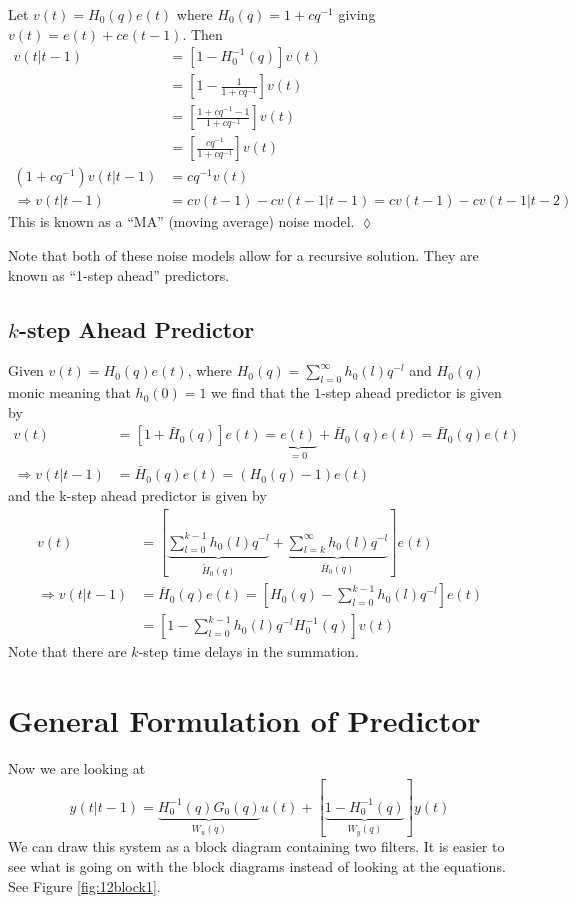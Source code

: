 \begin{example}
Let $v(t)=H_0(q)e(t)$ where $H_0(q)=1+cq^{-1}$ giving $v(t)=e(t)+ce(t-1)$. Then
\begin{align*}
v(t|t-1) &= [1-H_0^{-1}(q)]v(t) \\
&= \left[1-\frac{1}{1+cq^{-1}}\right]v(t) \\
&= \left[\frac{1+cq^{-1}-1}{1+cq^{-1}}\right]v(t) \\
&= \left[\frac{cq^{-1}}{1+cq^{-1}}\right]v(t) \\
(1+cq^{-1})v(t|t-1) &= cq^{-1}v(t) \\
\Rightarrow v(t|t-1) &= cv(t-1)-cv(t-1|t-1) = cv(t-1)-cv(t-1|t-2)
\end{align*}
This is known as a ``MA'' (moving average) noise model.
$\lozenge$
\end{example}

Note that both of these noise models allow for a recursive solution. They are known as ``1-step ahead'' predictors.

\subsection{$k$-step Ahead Predictor}
Given $v(t)=H_0(q)e(t)$, where $H_0(q)=\sum_{l=0}^\infty h_0(l)q^{-l}$ and $H_0(q)$ monic meaning that $h_0(0)=1$ we find that the $1$-step ahead predictor is given by
\begin{align*}
v(t) &= [1+\bar{H}_0(q)]e(t) = \underbrace{e(t)}_{=0}+\bar{H}_0(q)e(t) = \bar{H}_0(q)e(t) \\
\Rightarrow v(t|t-1) &= \bar{H}_0(q)e(t) = (H_0(q)-1)e(t)
\end{align*}
and the k-step ahead predictor is given by
\begin{align*}
v(t) &= \left[\underbrace{\sum_{l=0}^{k-1}h_0(l)q^{-l}}_{\tilde{H}_0(q)} + \underbrace{\sum_{l=k}^\infty h_0(l)q^{-l}}_{\bar{H}_0(q)}\right]e(t) \\
\Rightarrow v(t|t-1) &= \bar{H}_0(q)e(t) = \left[H_0(q)-\sum_{l=0}^{k-1}h_0(l)q^{-l}\right]e(t) \\
&= \left[1-\sum_{l=0}^{k-1}h_0(l)q^{-l}H_0^{-1}(q)\right]v(t)
\end{align*}
Note that there are $k$-step time delays in the summation.

\section{General Formulation of Predictor}
\label{sec:generalpredictor}
Now we are looking at
$$y(t|t-1) = \underbrace{H_0^{-1}(q)G_0(q)}_{W_u(q)}u(t) + [\underbrace{1-H_0^{-1}(q)}_{W_y(q)}]y(t)$$
We can draw this system as a block diagram containing two filters. It is easier to see what is going on with the block diagrams instead of looking at the equations. See Figure \ref{fig:12block1}.

